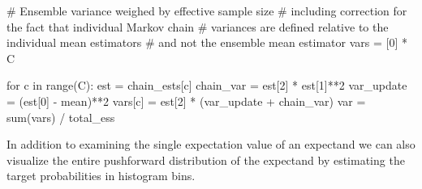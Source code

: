 \documentclass[
  letterpaper,
  DIV=11,
  numbers=noendperiod]{scrartcl}
\newenvironment{Shaded}{\begin{snugshade}}{\end{snugshade}}
\newcommand{\BuiltInTok}[1]{\textcolor[rgb]{0.00,0.23,0.31}{#1}}
\newcommand{\CommentTok}[1]{\textcolor[rgb]{0.37,0.37,0.37}{#1}}
\newcommand{\ControlFlowTok}[1]{\textcolor[rgb]{0.00,0.23,0.31}{#1}}
\newcommand{\DecValTok}[1]{\textcolor[rgb]{0.68,0.00,0.00}{#1}}
\newcommand{\KeywordTok}[1]{\textcolor[rgb]{0.00,0.23,0.31}{#1}}
\newcommand{\NormalTok}[1]{\textcolor[rgb]{0.00,0.23,0.31}{#1}}
\newcommand{\OperatorTok}[1]{\textcolor[rgb]{0.37,0.37,0.37}{#1}}
\begin{document}
\begin{Shaded}
\begin{Highlighting}[]
  \CommentTok{\# Ensemble variance weighed by effective sample size}
  \CommentTok{\# including correction for the fact that individual Markov chain}
  \CommentTok{\# variances are defined relative to the individual mean estimators}
  \CommentTok{\# and not the ensemble mean estimator}
  \BuiltInTok{vars} \OperatorTok{=}\NormalTok{ [}\DecValTok{0}\NormalTok{] }\OperatorTok{*}\NormalTok{ C}
  
  \ControlFlowTok{for}\NormalTok{ c }\KeywordTok{in} \BuiltInTok{range}\NormalTok{(C):}
\NormalTok{    est }\OperatorTok{=}\NormalTok{ chain\_ests[c]}
\NormalTok{    chain\_var }\OperatorTok{=}\NormalTok{ est[}\DecValTok{2}\NormalTok{] }\OperatorTok{*}\NormalTok{ est[}\DecValTok{1}\NormalTok{]}\OperatorTok{**}\DecValTok{2}
\NormalTok{    var\_update }\OperatorTok{=}\NormalTok{ (est[}\DecValTok{0}\NormalTok{] }\OperatorTok{{-}}\NormalTok{ mean)}\OperatorTok{**}\DecValTok{2}
    \BuiltInTok{vars}\NormalTok{[c] }\OperatorTok{=}\NormalTok{ est[}\DecValTok{2}\NormalTok{] }\OperatorTok{*}\NormalTok{ (var\_update }\OperatorTok{+}\NormalTok{ chain\_var)}
\NormalTok{  var }\OperatorTok{=} \BuiltInTok{sum}\NormalTok{(}\BuiltInTok{vars}\NormalTok{) }\OperatorTok{/}\NormalTok{ total\_ess}
  
\end{Highlighting}
\end{Shaded}

In addition to examining the single expectation value of an expectand we
can also visualize the entire pushforward distribution of the expectand
by estimating the target probabilities in histogram bins.
\end{document}
